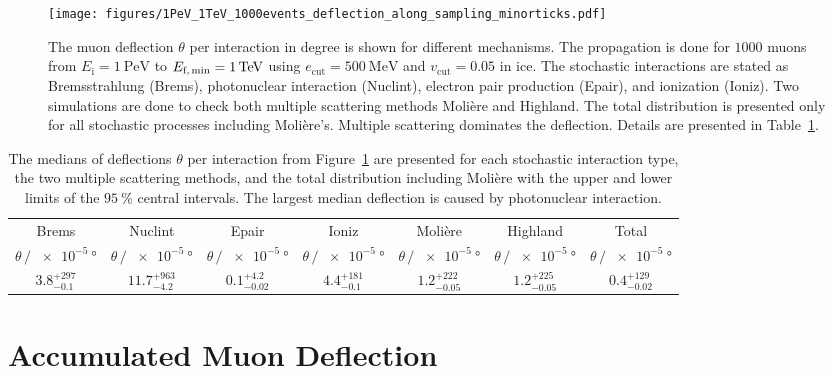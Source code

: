 \begin{figure*}
    \centering 
    \texttt{[image: figures/1PeV\_1TeV\_1000events\_deflection\_along\_sampling\_minorticks.pdf]}
    \caption{The muon deflection $\theta$ per interaction in degree is shown for different mechanisms. The propagation is done for $\num{1000}$ 
    muons from $E_{\text{i}} = \SI{1}{\peta\electronvolt}$ to $E_{\text{f,\,min}} = \SI{1}{\tera\electronvolt}$ using $e_{\mathrm{cut}} = \SI{500}{\mega\electronvolt}$ and $v_{\mathrm{cut}} = 0.05$ in ice. 
    The stochastic interactions 
    are stated as Bremsstrahlung (Brems), photonuclear interaction (Nuclint), electron pair production (Epair), and ionization (Ioniz).
    Two simulations 
    are done to check both multiple scattering methods Molière and Highland.  
    The total distribution is presented only for all stochastic processes including Molière's. Multiple scattering dominates the deflection. Details are presented in 
    Table~\ref{tab:defl_per_int}.}
    \label{fig:defl_per_int}
\end{figure*}

\begin{table*}
    \centering 
    \caption{The medians of deflections $\theta$ per interaction from Figure~\ref{fig:defl_per_int} are presented for each stochastic interaction type, the two multiple scattering methods, and the total distribution including Molière with the upper and lower limits of the $\SI{95}{\percent}$ 
    central intervals. The largest median deflection is caused by photonuclear interaction.}
    \begin{tabular}{ccccccc}
        \toprule 
        Brems & Nuclint & Epair & Ioniz & Molière & Highland & Total  \vspace{6pt} \\
        $\theta\,/\,\SI{e-5}{\degree}$ & $\theta\,/\,\SI{e-5}{\degree}$ & $\theta\,/\,\SI{e-5}{\degree}$ & $\theta\,/\,\SI{e-5}{\degree}$ & $\theta\,/\,\SI{e-5}{\degree}$ & $\theta\,/\,\SI{e-5}{\degree}$ & $\theta\,/\,\SI{e-5}{\degree}$\\
        \midrule 
        $3.8_{-0.1}^{+297}$ & $11.7_{-4.2}^{+963}$ & $0.1_{-0.02}^{+4.2}$ & $4.4_{-0.1}^{+181}$& $1.2_{-0.05}^{+222}$ & $1.2_{-0.05}^{+225}$ & $0.4_{-0.02}^{+129}$\\ 
        \bottomrule
    \end{tabular}
    \label{tab:defl_per_int}
\end{table*}

\section{Accumulated Muon Deflection}\label{sec:accum_defl}

